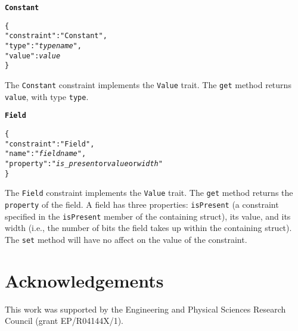 \documentclass[10pt,twocolumn,a4paper]{article}
\newcommand{\code}[1]{\texttt{#1}}
\begin{document}
\textbf{\texttt{Constant}}

\footnotesize
\begin{alltt}
  \{
    "constraint"   : "Constant",
    "type"         : "\emph{type name}",
    "value"        : \emph{value}
  \}
\end{alltt}
\normalsize

The \code{Constant} constraint implements the \code{Value} trait. The \code{get} method
returns \code{value}, with type \code{type}.

\textbf{\texttt{Field}}

\footnotesize
\begin{alltt}
  \{
    "constraint"   : "Field",
    "name"         : "\emph{field name}",
    "property"     : "\emph{is\_present} or \emph{value} or \emph{width}"
  \}
\end{alltt}
\normalsize

The \code{Field} constraint implements the \code{Value} trait. The \code{get} method
returns the \code{property} of the field. A field has three properties: \code{isPresent}
(a constraint specified in the \code{isPresent} member of the containing struct), its
value, and its width (i.e., the number of bits the field takes up within the containing
struct). The \code{set} method will have no affect on the value of the constraint.

\section{Acknowledgements}

This work was supported by the Engineering and Physical Sciences Research
Council (grant EP/R04144X/1).



\ifpdf
  \ifdefined\pdftrailerid
    \pdftrailerid{}
  \fi
\fi
\end{document}
